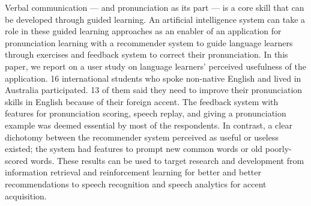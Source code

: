 Verbal communication --- and pronunciation as its part --- is a core skill that can be developed through guided learning. An artificial intelligence system can take a role in these guided learning approaches as an enabler of an application for pronunciation learning with a recommender system to guide language learners through exercises and feedback system to correct their pronunciation. In this paper, we report on a user study on language learners' perceived usefulness of the application. 16 international students who spoke non-native English and lived in Australia participated. 13 of them said they need to improve their pronunciation skills in English because of their foreign accent. The feedback system with features for pronunciation scoring, speech replay, and giving a pronunciation example was deemed essential by most of the respondents. In contrast, a clear dichotomy between the recommender system perceived as useful or useless existed; the system had features to prompt new common words or old poorly-scored words. These results can be used to target research and development from information retrieval and reinforcement learning for better and better recommendations to speech recognition and speech analytics for accent acquisition.
